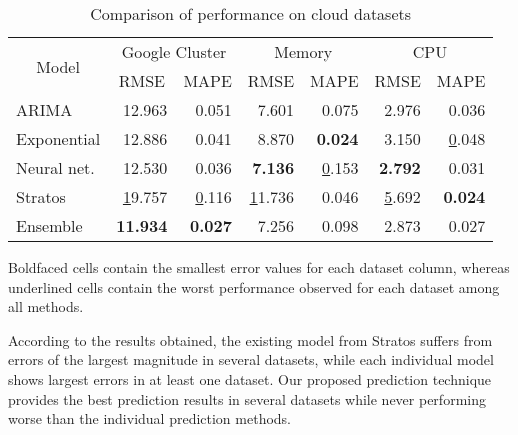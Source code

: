 \begin{table}[]
\centering
\caption{Comparison of performance on cloud datasets}
\begin{tabular}{|l|r|r|r|r|r|r|}
\hline
\multicolumn{1}{|c|}{\multirow{2}{*}{Model}} & \multicolumn{2}{c|}{Google Cluster}                   & \multicolumn{2}{c|}{Memory}                & \multicolumn{2}{c|}{CPU}                              \\ \cline{2-7} 
\multicolumn{1}{|c|}{}                       & \multicolumn{1}{c|}{RMSE} & \multicolumn{1}{c|}{MAPE} & RMSE           & \multicolumn{1}{l|}{MAPE} & \multicolumn{1}{l|}{RMSE} & \multicolumn{1}{l|}{MAPE} \\ \hline
ARIMA                                        & 12.963                    & 0.051                     & 7.601          & 0.075                     & 2.976                     & 0.036                     \\ \hline
Exponential                                  & 12.886                    & 0.041                     & 8.870          & \textbf{0.024}            & 3.150                     & {\ul 0.048}               \\ \hline
Neural net.                                  & 12.530                    & 0.036                     & \textbf{7.136} & {\ul 0.153}               & \textbf{2.792}            & 0.031                     \\ \hline
Stratos                                      & {\ul 19.757}              & {\ul 0.116}               & {\ul 11.736}   & 0.046                     & {\ul 5.692}               & \textbf{0.024}            \\ \hline
Ensemble                                     & \textbf{11.934}           & \textbf{0.027}            & 7.256          & 0.098                     & 2.873                     & 0.027                     \\ \hline
\end{tabular}
\end{table}

Boldfaced cells contain the smallest error values for each dataset column, whereas underlined cells contain the worst performance observed for each dataset among all methods.

According to the results obtained, the existing model from Stratos suffers from errors of the largest magnitude in several datasets, while each individual model shows largest errors in at least one dataset. Our proposed prediction technique provides the best prediction results in several datasets while never performing worse than the individual prediction methods.